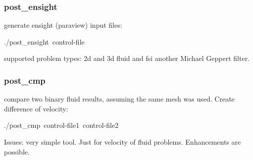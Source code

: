 \subsubsection{post\_ensight}

generate ensight (paraview) input files:

\begin{lyxcode}
./post\_ensight~control-file
\end{lyxcode}
supported problem types: 2d and 3d fluid and fsi another Michael Geppert
filter.


\subsubsection{post\_cmp}

compare two binary fluid results, assuming the same mesh was used.
Create difference of velocity:

\begin{lyxcode}
./post\_cmp~control-file1~control-file2
\end{lyxcode}
Issues: very simple tool. Just for velocity of fluid problems. Enhancements
are possible.

